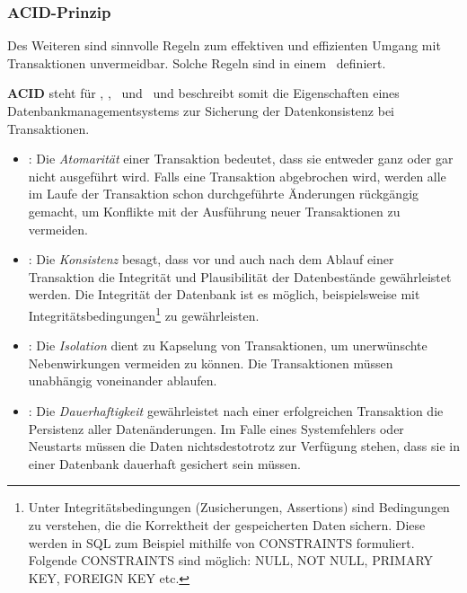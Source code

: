 \subsubsection{ACID-Prinzip}\label{acid}

Des Weiteren sind sinnvolle Regeln zum effektiven und effizienten Umgang mit Transaktionen unvermeidbar. Solche Regeln sind in einem \acid\ definiert.

\textbf{ACID} steht für \Acid, \aCid, \acId\ und \aciD\ und beschreibt somit die Eigenschaften eines Datenbankmanagementsystems zur Sicherung der Datenkonsistenz bei Transaktionen.
\begin{itemize}

\item \Acid: Die \textit{Atomarität} einer Transaktion bedeutet, dass sie entweder ganz oder gar nicht ausgeführt wird. Falls eine Transaktion abgebrochen wird, werden alle im Laufe der Transaktion schon durchgeführte Änderungen rückgängig gemacht, um Konflikte mit der Ausführung neuer Transaktionen zu vermeiden.%
\item \aCid: Die \textit{Konsistenz} besagt, dass vor und auch nach dem Ablauf einer Transaktion die Integrität und Plausibilität der Datenbestände gewährleistet werden. Die Integrität der Datenbank ist es möglich, beispielsweise mit Integritätsbedingungen\footnote{Unter Integritätsbedingungen (Zusicherungen, Assertions) sind Bedingungen zu verstehen, die die Korrektheit der gespeicherten Daten sichern. Diese werden in SQL zum Beispiel mithilfe von CONSTRAINTS formuliert. Folgende CONSTRAINTS sind möglich: NULL, NOT NULL, PRIMARY KEY, FOREIGN KEY etc.} zu gewährleisten. 
\item \acId: Die \textit{Isolation} dient zu Kapselung von Transaktionen, um unerwünschte Nebenwirkungen vermeiden zu können. Die Transaktionen müssen unabhängig voneinander ablaufen.
\item \aciD: Die \textit{Dauerhaftigkeit} gewährleistet nach einer erfolgreichen Transaktion die Persistenz aller Datenänderungen. Im Falle eines Systemfehlers oder Neustarts müssen die Daten nichtsdestotrotz zur Verfügung stehen, dass sie in einer Datenbank dauerhaft gesichert sein müssen.
\end{itemize}


